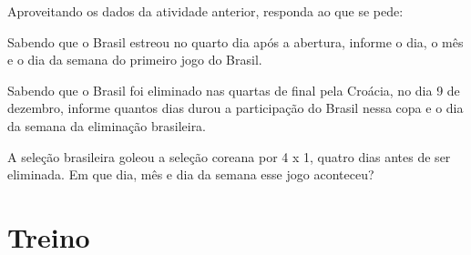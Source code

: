 Aproveitando os dados da atividade anterior, responda ao que se pede:

\begin{escolha}[itemsep=-5pt]
\item Sabendo que o Brasil estreou no quarto dia após a abertura, informe o dia, o
  mês e o dia da semana do primeiro jogo do Brasil.

\item Sabendo que o Brasil foi eliminado nas quartas de final pela Croácia,
  no dia 9 de dezembro, informe quantos dias durou a participação do
  Brasil nessa copa e o dia da semana da eliminação brasileira.

\item A seleção brasileira goleou a seleção coreana por 4 x 1, quatro dias
  antes de ser eliminada. Em que dia, mês e dia da semana esse jogo
  aconteceu?
\end{escolha}








\pagebreak
\section*{Treino}

